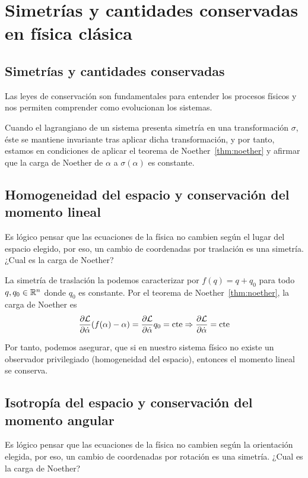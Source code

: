 \section{Simetrías y cantidades conservadas en física clásica}\label{sec:simetrías-y-cantidades-conservadas-en-física-clásica}

\subsection{Simetrías y cantidades conservadas}\label{subsec:simetrías-y-cantidades-conservadas}

Las leyes de conservación son fundamentales para entender los procesos físicos y nos permiten comprender como evolucionan los sistemas.

Cuando el lagrangiano de un sistema presenta simetría en una transformación $\sigma$, éste se mantiene invariante tras aplicar dicha transformación, y por tanto, estamos en condiciones de aplicar el teorema de Noether~\eqref{thm:noether} y afirmar que la carga de Noether de $\alpha$ a $\sigma(\alpha)$ es constante.

\subsection{Homogeneidad del espacio y conservación del momento lineal}\label{subsec:homogeneidad-del-espacio-y-conservación-del-momento-lineal}
Es lógico pensar que las ecuaciones de la física no cambien según el lugar del espacio elegido, por eso, un cambio de coordenadas por traslación es una simetría.
¿Cual es la carga de Noether?

La simetría de traslación la podemos caracterizar por $f(q)=q+q_0$ para todo $q, q_0\in\mathbb{R}^n$ donde $q_0$ es constante.
Por el teorema de Noether~\eqref{thm:noether}, la carga de Noether es
\begin{equation}
	\label{eq:conservacion_momento_lineal}
	\frac{\partial \mathcal{L}}{\partial\dot{\alpha}}(f(\alpha)-\alpha) = \frac{\partial \mathcal{L}}{\partial\dot{\alpha}}q_0=\text{cte}\Rightarrow\frac{\partial \mathcal{L}}{\partial\dot{\alpha}}=\text{cte}
\end{equation}

Por tanto, podemos asegurar, que si en nuestro sistema físico no existe un observador privilegiado (homogeneidad del espacio), entonces el momento lineal se conserva.

\subsection{Isotropía del espacio y conservación del momento angular}\label{subsec:isotropic-del-espacio-y-conservación-del-momento-angular}
Es lógico pensar que las ecuaciones de la física no cambien según la orientación elegida, por eso, un cambio de coordenadas por rotación es una simetría.
¿Cual es la carga de Noether?

